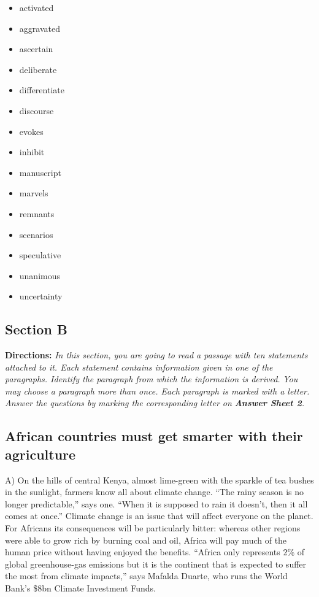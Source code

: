 \documentclass[UTF8,11pt]{ctexart}
\begin{document}
\begin{itemize}[leftmargin=2em,itemsep=.2em,topsep=.4em]\item[A.] activated
\item[B.] aggravated
\item[C.] ascertain
\item[D.] deliberate
\item[E.] differentiate
\item[F.] discourse
\item[G.] evokes
\item[H.] inhibit
\item[I.] manuscript
\item[J.] marvels
\item[K.] remnants
\item[L.] scenarios
\item[M.] speculative
\item[N.] unanimous
\item[O.] uncertainty
\end{itemize}

\subsection*{\textbf{Section B}}


\textbf{Directions:} \textit{In this section, you are going to read a passage with ten statements attached to it. Each statement} \textit{contains information given in one of the paragraphs. Identify the paragraph from which the information is derived.} \textit{You may choose a paragraph more than once. Each paragraph is marked with a letter. Answer the questions by} \textit{marking the corresponding letter on }\textbf{\textit{Answer Sheet 2}}\textit{.}


\subsection*{\textbf{African countries must get smarter with their agriculture}}


A) On the hills of central Kenya, almost lime-green with the sparkle of tea bushes in the sunlight, farmers know all about climate change. “The rainy season is no longer predictable,” says one. “When it is supposed to rain it doesn’t, then it all comes at once.” Climate change is an issue that will affect everyone on the planet. For Africans its consequences will be particularly bitter: whereas other regions were able to grow rich by burning coal and oil, Africa will pay much of the human price without having enjoyed the benefits. “Africa only represents 2\% of global greenhouse-gas emissions but it is the continent that is expected to suffer the most from climate impacts,” says Mafalda Duarte, who runs the World Bank’s \$8bn Climate Investment Funds.
\end{document}
